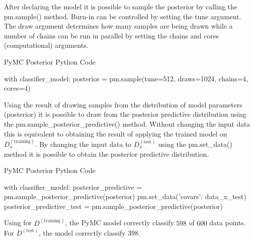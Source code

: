 \begin{example}
	
	After declaring the model it is possible to sample the posterior by calling the pm.sample() method. Burn-in can be controlled by setting the tune argument. The draw argument determines how many samples are being drawn while a number of chains can be run in parallel by setting the chains and cores (computational) arguments. 	
	\begin{algorithm}[H]
		\label{algo:posteriro}
		\caption{PyMC Posterior Python Code}
		\begin{python}
			with classifier_model:
			posterior = pm.sample(tune=512, draws=1024, chains=4, cores=4)
		\end{python}  
	\end{algorithm}
	
	Using the result of drawing samples from the distribution of model parameters (posterior) it is possible to draw from the posterior predictive distribution using the pm.sample\_posterior\_predictive() method. Without changing the input data this is equivalent to obtaining the result of applying the trained model on $D_x^{(\text{training})}$. By changing the input data to $D_x^{(\text{test})}$ using the pm.set\_data() method it is possible to obtain the posterior predictive distribution.
	
	\begin{algorithm}[H]
		\label{algo:posteriro_predictive}
		\caption{PyMC Posterior Python Code}
		\begin{python}
			with classifier_model:
			posterior_predictive = pm.sample_posterior_predictive(posterior)
			pm.set_data({'covars': data_x_test})
			posterior_predictive_test = pm.sample_posterior_predictive(posterior)
		\end{python}
	\end{algorithm}
	
	Using  for $D^{(\text{training})}$, the PyMC model correctly classify $598$ of $600$ data points. For $D^{(\text{test})}$, the model correctly classify $398$.
	

\end{example}
